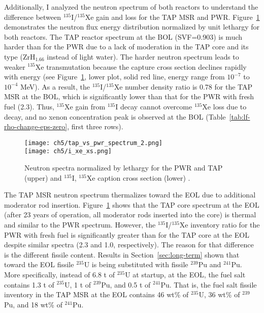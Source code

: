 Additionally, I analyzed the neutron spectrum of both reactors to understand 
the difference 
between $^{135}$I/$^{135}$Xe gain and loss for the \gls{TAP} \gls{MSR} and 
\gls{PWR}. Figure~\ref{fig:tap-pwr-spectrum} 
demonstrates the neutron flux energy distribution normalized by unit lethargy 
for both reactors. The \gls{TAP} reactor spectrum at the \gls{BOL} (SVF=0.903) 
is much harder than for the \gls{PWR} due to a lack of moderation in the 
\gls{TAP} core and its type (ZrH$_{1.66}$ instead of light water). The harder 
neutron spectrum leads to weaker $^{135}$Xe transmutation because the capture 
cross section declines rapidly with energy (see 
Figure~\ref{fig:tap-pwr-spectrum}, lower plot, solid red line, energy range 
from $10^{-7}$ to $10^{-4}$ MeV). As a result, the $^{135}$I/$^{135}$Xe number 
density ratio is 0.78 for the \gls{TAP} \gls{MSR} at the \gls{BOL}, which is 
significantly lower than that for the \gls{PWR} with fresh fuel (2.3). 
Thus, $^{135}$Xe gain from $^{135}$I decay cannot overcome $^{135}$Xe loss due 
to decay, and no xenon concentration peak is observed at the \gls{BOL} 
(Table~\ref{tab:lf-rho-change-eps-zero}, first three rows).
\begin{figure}[hbp!] %
	\centering
	\texttt{[image: ch5/tap\_vs\_pwr\_spectrum\_2.png]}\\
	\vspace{-19mm}
	\hspace{+0.05mm}
	\texttt{[image: ch5/i\_xe\_xs.png]}
	\vspace{-8mm}
	\caption{Neutron spectra normalized by lethargy for the \gls{PWR} and 
		\gls{TAP} (upper) and $^{135}$I, $^{135}$Xe caption cross 
		section (lower) \cite{rykhlevskii_impact_2019}.}
	\label{fig:tap-pwr-spectrum}
\end{figure}


The \gls{TAP} \gls{MSR} neutron spectrum thermalizes toward the \gls{EOL} due 
to additional moderator rod insertion. Figure~\ref{fig:tap-pwr-spectrum} 
shows that the \gls{TAP} core spectrum at the \gls{EOL} (after 23 years of 
operation, all moderator rods inserted into the core) is thermal and  similar 
to the \gls{PWR} spectrum. However, the $^{135}$I/$^{135}$Xe inventory ratio 
for the \gls{PWR} with fresh fuel is significantly greater than for the 
\gls{TAP} core at the \gls{EOL} despite similar spectra (2.3 and 1.0, 
respectively). The reason for that difference is the different fissile 
content. Results in Section~\ref{sec:long-term} shown that toward the 
\gls{EOL} fissile $^{235}$U is being substituted with fissile $^{239}$Pu and 
$^{241}$Pu. More specifically, instead of 6.8 t of $^{235}$U at startup, 
at the \gls{EOL}, the fuel salt contains 1.3 t of $^{235}$U, 1 t of 
$^{239}$Pu, and 0.5 t of $^{241}$Pu. That is, the fuel salt fissile inventory 
in the \gls{TAP} \gls{MSR} at the \gls{EOL} contains 46 wt\% of $^{235}$U, 36 
wt\% of $^{239}$Pu, and 18 wt\% of $^{241}$Pu.

